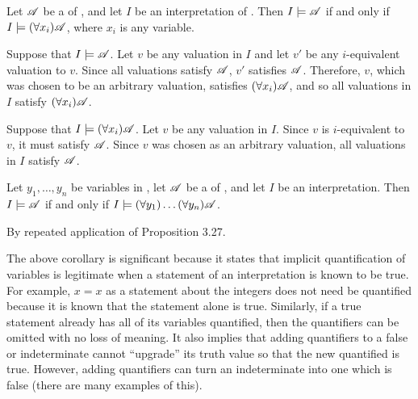 \begin{proposition}
  Let \(\mathscr{A}\) be a \wf{} of \cl{}, and let \(I\) be an interpretation of \cl{}. Then \(I \models \mathscr{A}\) if and only if \(I \models (\forall x_i) \mathscr{A}\), where \(x_i\) is any variable.

  \prf{} \Ra{} Suppose that \(I \models \mathscr{A}\). Let \(v\) be any valuation in \(I\) and let \(v'\) be any \(i\)-equivalent valuation to \(v\). Since all valuations satisfy \(\mathscr{A}\), \(v'\) satisfies \(\mathscr{A}\). Therefore, \(v\), which was chosen to be an arbitrary valuation, satisfies \((\forall x_i)\mathscr{A}\), and so all valuations in \(I\) satisfy \((\forall x_i)\mathscr{A}\).

  \La{} Suppose that \(I \models (\forall x_i) \mathscr{A}\). Let \(v\) be any valuation in \(I\). Since \(v\) is \(i\)-equivalent to \(v\), it must satisfy \(\mathscr{A}\). Since \(v\) was chosen as an arbitrary valuation, all valuations in \(I\) satisfy \(\mathscr{A}\).
\end{proposition}

\begin{corollary}
  Let \(y_1, \dots, y_n\) be variables in \cl{}, let \(\mathscr{A}\) be a \wf{} of \cl{}, and let \(I\) be an interpretation. Then \(I \models \mathscr{A}\) if and only if \(I \models (\forall y_1) \dots (\forall y_n) \mathscr{A}\).

  \prf{} By repeated application of Proposition 3.27.
\end{corollary}

The above corollary is significant because it states that implicit quantification of variables is legitimate when a statement of an interpretation is known to be true. For example, \(x = x\) as a statement about the integers does not need be quantified because it is known that the statement alone is true. Similarly, if a true statement already has all of its variables quantified, then the quantifiers can be omitted with no loss of meaning. It also implies that adding quantifiers to a false or indeterminate \wf{} cannot ``upgrade'' its truth value so that the new quantified \wf{} is true. However, adding quantifiers can turn an indeterminate \wf{} into one which is false (there are many examples of this).

